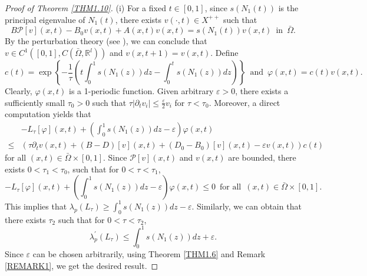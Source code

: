 \documentclass[11pt,reqno]{amsart}
\numberwithin{equation}{section}
\begin{document}
\begin{proof}[Proof of Theorem \ref{THM1.10}]
\indent

(i) For a fixed $t\in [0,1]$, since $s(N_{1}(t))$ is the principal eigenvalue of $N_{1}(t)$, there exists $v(\cdot,t)\in X^{++}$ such that
\begin{equation*}
B\mathcal{P}[v](x,t) - B_{0}v(x,t) + A(x,t)v(x,t) = s(N_{1}(t)) v(x,t) \enspace\text{in}\enspace \bar{\Omega}.
\end{equation*}
By the perturbation theory (see \cite{Kato}), we can conclude that $v\in C^{1}([0,1],C(\bar{\Omega},\mathbb{R}^{l}))$ and $v(x,t+1)=v(x,t)$.
Define
\begin{equation*}
c(t)=\exp \left\{ -\frac{1}{\tau} \left( t\int_{0}^{1}s(N_{1}(z))dz - \int_{0}^{t} s(N_{1}(z))dz \right) \right\}
\enspace \text{and} \enspace
\varphi(x,t)=c(t)v(x,t).
\end{equation*}
Clearly, $\varphi(x,t)$ is a 1-periodic function.
Given arbitrary $\varepsilon>0$, there exists a sufficiently small $\tau_{0}>0$ such that $\tau|\partial_{t}v_{i}|\leq \frac{\varepsilon}{2}v_{i}$ for $\tau<\tau_{0}$. Moreover,
a direct computation yields that
\begin{align*}
&-L_{\tau}[\varphi](x,t)+ \left( \int_{0}^{1} s(N_{1}(z)) dz - \varepsilon \right) \varphi(x,t) \\
\leq&
\left( \tau \partial_{t}v(x,t) + \left( B- D \right)[v](x,t) +\left( D_{0} - B_{0} \right)[v](x,t)- \varepsilon v(x,t) \right) c(t)
\end{align*}
for all $(x,t)\in \bar{\Omega}\times [0,1]$.
Since   $\mathcal{P}[v](x,t)$ and $v(x,t)$ are bounded, there exists $0<\tau_{1}<\tau_{0}$, such that for $0<\tau<\tau_{1}$,
\begin{equation*}
-L_{\tau}[\varphi](x,t)+ \left( \int_{0}^{1} s(N_{1}(z)) dz - \varepsilon \right) \varphi(x,t)\le 0 \enspace\text{for all}\enspace (x,t) \in \bar{\Omega}\times [0,1].
\end{equation*}
This implies that $\lambda_{p}(L_{\tau}) \geq \int_{0}^{1} s(N_{1}(z)) dz - \varepsilon$. Similarly, we can obtain that there exists $\tau_{2}$ such that for $0<\tau<\tau_{2}$,
\begin{equation*}
\lambda_{p}^{\prime}(L_{\tau}) \leq \int_{0}^{1} s(N_{1}(z)) dz + \varepsilon.
\end{equation*}
Since $\varepsilon$ can be chosen arbitrarily, using Theorem \ref{THM1.6} and Remark \ref{REMARK1}, we get the desired result.


\end{proof}
\end{document}
